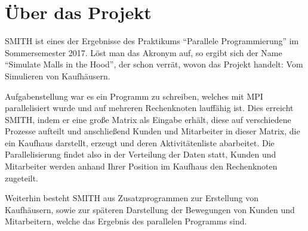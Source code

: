 \section{Über das Projekt}
SMITH ist eines der Ergebnisse des Praktikums \enquote{Parallele Programmierung} im Sommersemester 2017. Löst man das Akronym auf, so ergibt sich der Name \enquote{Simulate Malls in the Hood}, der schon verrät, wovon das Projekt handelt: Vom Simulieren von Kaufhäusern.

Aufgabenstellung war es ein Programm zu schreiben, welches mit MPI parallelisiert wurde und auf mehreren Rechenknoten lauffähig ist.
Dies erreicht SMITH, indem er eine große Matrix als Eingabe erhält, diese auf verschiedene Prozesse aufteilt und anschließend Kunden und Mitarbeiter in dieser Matrix, die ein Kaufhaus darstellt, erzeugt und deren Aktivitätenliste abarbeitet. Die Parallelisierung findet also in der Verteilung der Daten statt, Kunden und Mitarbeiter werden anhand Ihrer Position im Kaufhaus den Rechenknoten zugeteilt.

Weiterhin besteht SMITH aus Zusatzprogrammen zur Erstellung von Kaufhäusern, sowie zur späteren Darstellung der Bewegungen von Kunden und Mitarbeitern, welche das Ergebnis des parallelen Programms sind.
